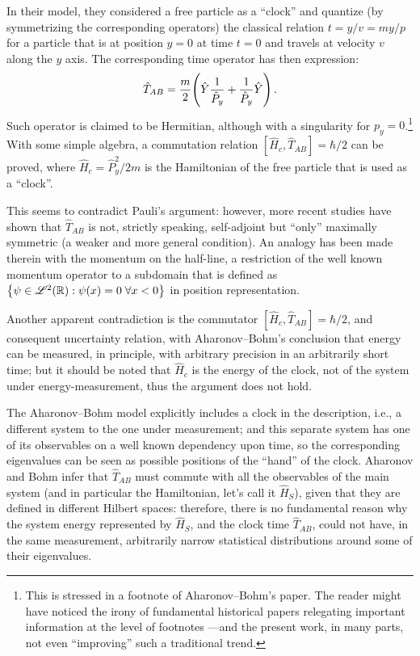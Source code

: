 In their model, they considered a free particle as a ``clock''
and quantize (by symmetrizing the corresponding operators)
the classical relation
$t = y / v = m y / p$
for a particle that is at position $y = 0$ at time $t = 0$ and travels at velocity $v$ along the $y$ axis.
The corresponding time operator has then expression:
\begin{equation}
  \hat{T}_{AB} = \frac{m}{2} \qty( \hat{Y} \frac{1}{\hat{P}_y} + \frac{1}{\hat{P}_y} \hat{Y} ) \,\text{.}
\end{equation}
Such operator is claimed to be Hermitian, although with a singularity for $p_{y} = 0$.\footnote{
  This is stressed in a footnote of Aharonov--Bohm's paper.
  The reader might have noticed the irony of fundamental historical papers
  relegating important information at the level of footnotes
  ---and the present work, in many parts, not even ``improving'' such a traditional trend.
}
With some simple algebra, a commutation relation $[\hat{H}_{c}, \hat{T}_{AB}] = \hbar/2$
can be proved, where $\hat{H}_c = \hat{P}_y^2/2m$ is the Hamiltonian of the free particle that is used as a ``clock''.

This seems to contradict Pauli's argument: however, more recent studies
\parencite{MugaAB98, MugaAB99, MugaAB99Err}
have shown that
$\hat{T}_{AB}$ is not, strictly speaking, self-adjoint but ``only'' maximally symmetric
(a weaker and more general condition).
An analogy has been made therein with the momentum on the half-line,
a restriction of the well known momentum operator to a subdomain
that is defined as
$\qty{\psi \in \mathcal{L}^2(\mathbb{R}): \psi(x) = 0 \; \forall x < 0}$ in position representation.

Another apparent contradiction is the commutator $[\hat{H}_{c}, \hat{T}_{AB}] = \hbar/2$,
and consequent uncertainty relation, with Aharonov--Bohm's conclusion that
energy can be measured, in principle, with arbitrary precision in an arbitrarily short time;
but it should be noted that $\hat{H}_{c}$ is the energy of the clock, not of the system under energy-measurement,
thus the argument does not hold.

The Aharonov--Bohm model explicitly includes a clock in the description, i.e.,
a different system to the one under measurement;
and this separate system has one of its observables
on a well known dependency upon time, so the corresponding eigenvalues can be seen
as possible positions of the ``hand'' of the clock.
Aharonov and Bohm infer that $\hat{T}_{AB}$ must commute with all the observables
of the main system (and in particular the Hamiltonian, let's call it $\hat{H}_S$),
given that they are defined in different Hilbert spaces:
therefore, there is no
fundamental reason why the system energy represented by $\hat{H}_S$, and the clock time $\hat{T}_{AB}$,
could not have, in the same measurement,
arbitrarily
narrow statistical distributions around some of their eigenvalues.


